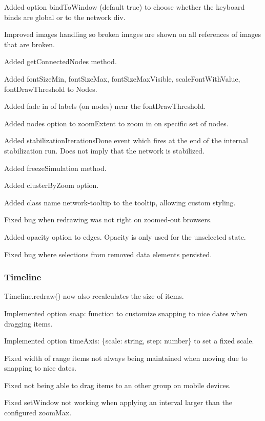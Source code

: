 \begin{DoxyItemize}
\item Added option bind\+To\+Window (default true) to choose whether the keyboard binds are global or to the network div.
\item Improved images handling so broken images are shown on all references of images that are broken.
\item Added get\+Connected\+Nodes method.
\item Added font\+Size\+Min, font\+Size\+Max, font\+Size\+Max\+Visible, scale\+Font\+With\+Value, font\+Draw\+Threshold to Nodes.
\item Added fade in of labels (on nodes) near the font\+Draw\+Threshold.
\item Added nodes option to zoom\+Extent to zoom in on specific set of nodes.
\item Added stabilization\+Iterations\+Done event which fires at the end of the internal stabilization run. Does not imply that the network is stabilized.
\item Added freeze\+Simulation method.
\item Added cluster\+By\+Zoom option.
\item Added class name \textquotesingle{}network-\/tooltip\textquotesingle{} to the tooltip, allowing custom styling.
\item Fixed bug when redrawing was not right on zoomed-\/out browsers.
\item Added opacity option to edges. Opacity is only used for the unselected state.
\item Fixed bug where selections from removed data elements persisted.
\end{DoxyItemize}

\subsubsection*{Timeline}


\begin{DoxyItemize}
\item {\ttfamily Timeline.\+redraw()} now also recalculates the size of items.
\item Implemented option {\ttfamily snap\+: function} to customize snapping to nice dates when dragging items.
\item Implemented option {\ttfamily time\+Axis\+: \{scale\+: string, step\+: number\}} to set a fixed scale.
\item Fixed width of range items not always being maintained when moving due to snapping to nice dates.
\item Fixed not being able to drag items to an other group on mobile devices.
\item Fixed {\ttfamily set\+Window} not working when applying an interval larger than the configured {\ttfamily zoom\+Max}.
\end{DoxyItemize}

